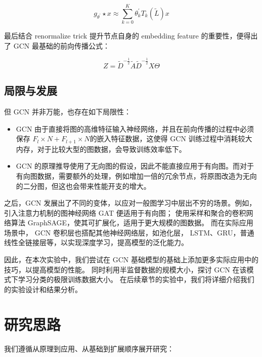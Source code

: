 \documentclass[12pt]{ctexart} %
\begin{document}
\[
    g_{\theta^{\prime}}\star x\approx\sum_{k=0}^{K}\theta_{k}^{\prime}T_{k}(\tilde{L})x
\]

最后结合 renormalize trick 提升节点自身的 embedding feature 的重要性，便得出了 GCN 最基础的前向传播公式：

\[
    Z=\tilde{D}^{-{\frac{1}{2}}}\tilde{A}\tilde{D}^{-{\frac{1}{2}}}X\Theta
\]



\subsection{局限与发展}


但 GCN 并非万能，也存在如下局限性：

\begin{itemize}
    \item GCN 由于直接将图的高维特征输入神经网络，并且在前向传播的过程中必须保存 $F_{l} \times N  + F_{l+1} \times N $的嵌入特征数据，这使得 GCN 训练过程中消耗较大内存，对于比较大型的图数据，会导致训练效率低下。
    \item GCN 的原理推导使用了无向图的假设，因此不能直接应用于有向图。而对于有向图数据，需要额外的处理，例如增加一倍的冗余节点，将原图改造为无向的二分图，但这也会带来性能开支的增大。
\end{itemize}


之后，GCN 发展出了不同的变体，以应对一般图学习中层出不穷的场景。例如，引入注意力机制的图神经网络 GAT 便适用于有向图； 使用采样和聚合的卷积网络算法 GraphSAGE，使其可扩展化，适用于更大规模的图数据。
而在实际应用场景中， GCN 卷积层也搭配其他神经网络层，如池化层， LSTM、GRU，普通线性全链接层等，以实现深度学习，提高模型的泛化能力。

因此，在本次实验中，我们尝试在 GCN 基础模型的基础上添加更多实际应用中的技巧，以提高模型的性能。
同时利用半监督数据的规模大小，探讨 GCN 在该模式下学习分类的极限训练数据大小。 在后续章节的实验中，我们将详细介绍我们的实验设计和结果分析。

\section{研究思路}

我们遵循从原理到应用、从基础到扩展顺序展开研究：
\end{document}
